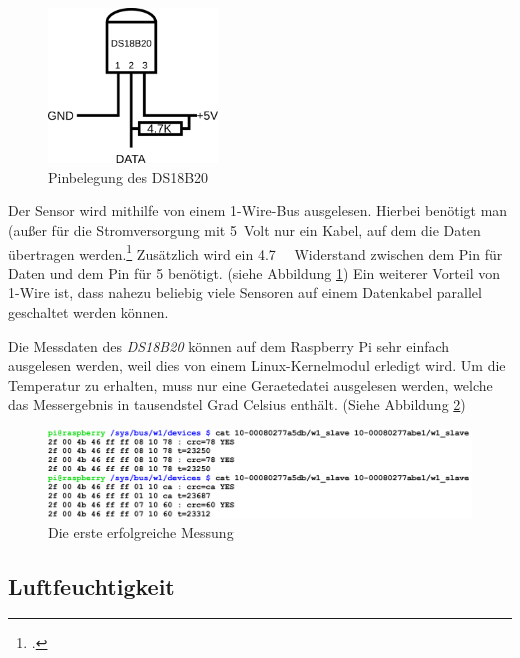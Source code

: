 \begin{figure}[h]
  \centering
     \includegraphics[width=0.4\textwidth]{figures/temp_pin.png}
  \caption{Pinbelegung des DS18B20}
  \label{fig:temp_pin}
\end{figure}

Der Sensor wird mithilfe von einem \gls{1-Wire}-\gls{Bus} ausgelesen. Hierbei benötigt man (außer für die Stromversorgung mit \SI{5}{\gls{Volt}} nur ein Kabel, auf dem die Daten übertragen werden.\footcite{1-wire} Zusätzlich wird ein \SI{4.7}{\kilo{}} Widerstand zwischen dem Pin für Daten und dem Pin für \SI[retain-explicit-plus]{+5}{} benötigt. (siehe Abbildung \ref{fig:temp_pin})
Ein weiterer Vorteil von 1-Wire ist, dass nahezu beliebig viele Sensoren auf einem Datenkabel parallel geschaltet werden können.

Die Messdaten des \emph{DS18B20} können auf dem Raspberry Pi sehr einfach ausgelesen werden, weil dies von einem Linux-\gls{Kernelmodul} erledigt wird. Um die Temperatur zu erhalten, muss  nur eine \gls{Geraetedatei} ausgelesen werden, welche das Messergebnis in tausendstel Grad Celsius enthält. (Siehe Abbildung \ref{fig:temp_screenshot})

\begin{figure}[h]
  \centering
     \includegraphics[width=\textwidth]{figures/temp_screenshot.png}
  \caption{Die erste erfolgreiche Messung}
  \label{fig:temp_screenshot}
\end{figure}

\subsection{Luftfeuchtigkeit}
\label{subsec:Luftfeuchtigkeit}

